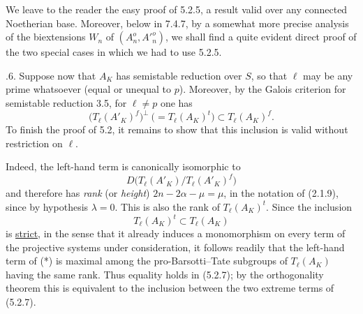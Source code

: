 We leave to the reader the easy proof of 5.2.5, a result valid over any
connected Noetherian base.  Moreover, below in 7.4.7, by a somewhat
more precise analysis of the biextensions $W_n$ of
$(A_n^o,{A'}_n^o)$, we shall find a quite evident direct proof of
the two special cases in which we had to use 5.2.5.

\smallskip
{}.6. Suppose now that $A_K$ has semistable reduction over $S$,
so that $\ell$ may be any prime whatsoever (equal or unequal to
$p$).  Moreover, by the Galois criterion for semistable reduction
3.5, for $\ell\neq p$ one has
\begin{equation}\tag{5.2.7}
 \bigl(T_\ell(A'_K)^f\bigr)^\perp
 \ \bigl(=T_\ell(A_K)^t\bigr)
 \subset T_\ell(A_K)^f.
\end{equation}
To finish the proof of 5.2, it remains to show that this inclusion is
valid without restriction on $\ell$.

Indeed, the left-hand term is canonically isomorphic to
\[
 D\bigl(T_\ell(A'_K)/T_\ell(A'_K)^f\bigr)
\]
and therefore has \emph{rank} (or \emph{height})
$2n-2\alpha-\mu=\mu$, in the notation of (2.1.9), since by
hypothesis $\lambda=0$.  This is also the rank of
$T_\ell(A_K)^t$.  Since the inclusion
\begin{equation}\tag{*}
 T_\ell(A_K)^t\subset T_\ell(A_K)
\end{equation}
is \underline{strict}, in the sense that it already induces a
monomorphism on every term of the projective systems under
consideration, it follows readily that the left-hand term of (*) is
maximal among the pro-Barsotti--Tate subgroups of $T_\ell(A_K)$
having the same rank.  Thus equality holds in (5.2.7); by the
orthogonality theorem this is equivalent to the inclusion between the
two extreme terms of (5.2.7).

